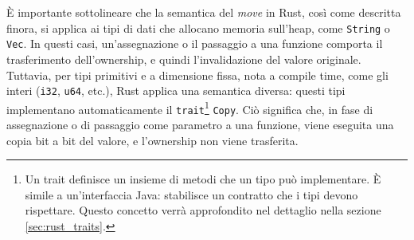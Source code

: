 È importante sottolineare che la semantica del \textit{move} in Rust, così come descritta finora, si applica ai tipi di dati che allocano memoria sull'heap, come \texttt{String} o \texttt{Vec}. In questi casi, un'assegnazione o il passaggio a una funzione comporta il trasferimento dell'ownership, e quindi l'invalidazione del valore originale. Tuttavia, per tipi primitivi e a dimensione fissa, nota a compile time, come gli interi (\texttt{i32}, \texttt{u64}, etc.), Rust applica una semantica diversa: questi tipi implementano automaticamente il \texttt{trait}\footnote{Un trait definisce un insieme di metodi che un tipo può implementare. È simile a un'interfaccia Java: stabilisce un contratto che i tipi devono rispettare. Questo concetto verrà approfondito nel dettaglio nella sezione \ref{sec:rust_traits}.} \texttt{Copy}. Ciò significa che, in fase di assegnazione o di passaggio come parametro a una funzione, viene eseguita una copia bit a bit del valore, e l'ownership non viene trasferita.

